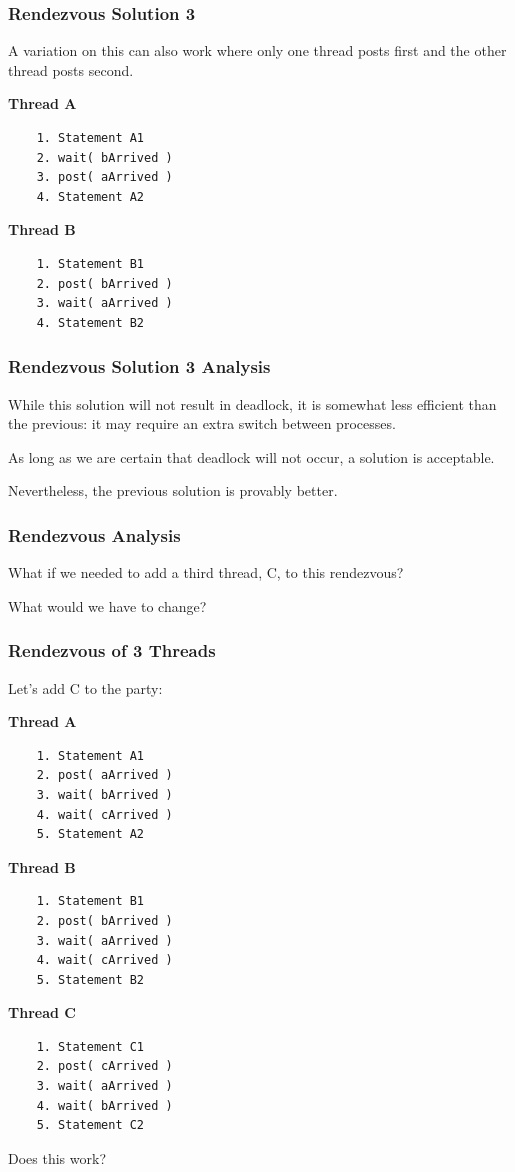 \begin{frame}[fragile]
	\frametitle{Rendezvous Solution 3}

	A variation on this can also work where only one thread posts first and the other thread posts second.

	\begin{multicols}{2}
		\textbf{Thread A}
		\begin{verbatim}
	1. Statement A1
	2. wait( bArrived )
	3. post( aArrived )
	4. Statement A2
  \end{verbatim}
		\columnbreak
		\textbf{Thread B}
		\begin{verbatim}
	1. Statement B1
	2. post( bArrived )
	3. wait( aArrived )
	4. Statement B2
  \end{verbatim}
	\end{multicols}
	\vspace{-2em}


\end{frame}

\begin{frame}
	\frametitle{Rendezvous Solution 3 Analysis}

	While this solution will not result in deadlock, it is somewhat less efficient than the previous: it may require an extra switch between processes.

	As long as we are certain that deadlock will not occur, a solution is acceptable.

	Nevertheless, the previous solution is provably better.

\end{frame}


\begin{frame}
	\frametitle{Rendezvous Analysis}

	What if we needed to add a third thread, C, to this rendezvous?

	What would we have to change?


\end{frame}

\begin{frame}[fragile]
	\frametitle{Rendezvous of 3 Threads}

	Let's add C to the party:

	\begin{multicols}{3}
		\textbf{Thread A}
		\begin{verbatim}
	1. Statement A1
	2. post( aArrived )
	3. wait( bArrived )
	4. wait( cArrived )
	5. Statement A2
  \end{verbatim}
		\columnbreak
		\textbf{Thread B}
		\begin{verbatim}
	1. Statement B1
	2. post( bArrived )
	3. wait( aArrived )
	4. wait( cArrived )
	5. Statement B2
  \end{verbatim}
  		\columnbreak
		\textbf{Thread C}
		\begin{verbatim}
	1. Statement C1
	2. post( cArrived )
	3. wait( aArrived )
	4. wait( bArrived )
	5. Statement C2
  \end{verbatim}
	\end{multicols}
	\vspace{-2em}

Does this work?

\end{frame}


